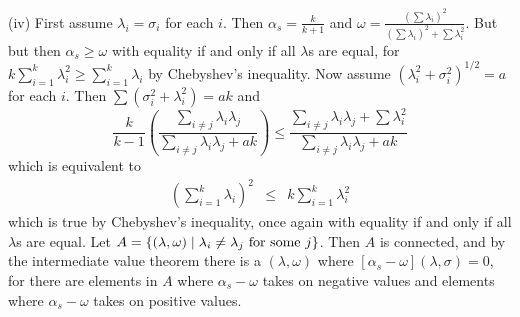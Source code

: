 \documentclass{article}
\makeatletter
\theoremstyle{plain}
\theoremstyle{plain}
\theoremstyle{definition}
\theoremstyle{remark}
\theoremstyle{definition}
\theoremstyle{plain}
\theoremstyle{plain}
\theoremstyle{definition}
\newenvironment{proof}[1][\protect\proofname]{\par
	\normalfont\topsep6\p@\@plus6\p@\relax
	\trivlist
	\itemindent\parindent
	\item[\hskip\labelsep\scshape #1]\ignorespaces
}{%
	\endtrivlist\@endpefalse
}
\providecommand{\proofname}{Proof}
\renewcommand{\sqrt}[1]{{(#1)^{1/2}}}
\makeatother
\begin{document}
\begin{proof}[Proof of Proposition \ref{prop:Reliabilities.}]
(iv) First assume $\lambda_{i}=\sigma_{i}$ for each $i$. Then $\alpha_{s}=\frac{k}{k+1}$
and $\omega=\frac{\left(\sum\lambda_{i}\right)^{2}}{\left(\sum\lambda_{i}\right)^{2}+\sum\lambda_{i}^{2}}$.
But but then $\alpha_{s}\geq\omega$ with equality if and only if
all $\lambda$s are equal, for $k\sum_{i=1}^{k}\lambda_{i}^{2}\geq\sum_{i=1}^{k}\lambda_{i}$
by Chebyshev's inequality. Now assume $\sqrt{\lambda_{i}^{2}+\sigma_{i}^{2}}=a$
for each $i$. Then $\sum\left(\sigma_{i}^{2}+\lambda_{i}^{2}\right)=ak$
and
\[
\frac{k}{k-1}\left(\frac{\sum_{i\neq j}\lambda_{i}\lambda_{j}}{\sum_{i\neq j}\lambda_{i}\lambda_{j}+ak}\right)\leq\frac{\sum_{i\neq j}\lambda_{i}\lambda_{j}+\sum\lambda_{i}^{2}}{\sum_{i\neq j}\lambda_{i}\lambda_{j}+ak}
\]
which is equivalent to
\begin{eqnarray*}
\left(\sum_{i=1}^{k}\lambda_{i}\right)^{2} & \leq & k\sum_{i=1}^{k}\lambda_{i}^{2}
\end{eqnarray*}
which is true by Chebyshev's inequality, once again with equality
if and only if all $\lambda$s are equal. Let $A=\left\{ \left(\lambda,\omega\right)\mid\lambda_{i}\neq\lambda_{j}\text{\textrm{ for some }}j\right\} $.
Then $A$ is connected, and by the intermediate value theorem there
is a $\left(\lambda,\omega\right)$ where $\left[\alpha_{s}-\omega\right]\left(\lambda,\sigma\right)=0$,
for there are elements in $A$ where $\alpha_{s}-\omega$ takes on
negative values and elements where $\alpha_{s}-\omega$ takes on positive
values.
\end{proof}
\end{document}
